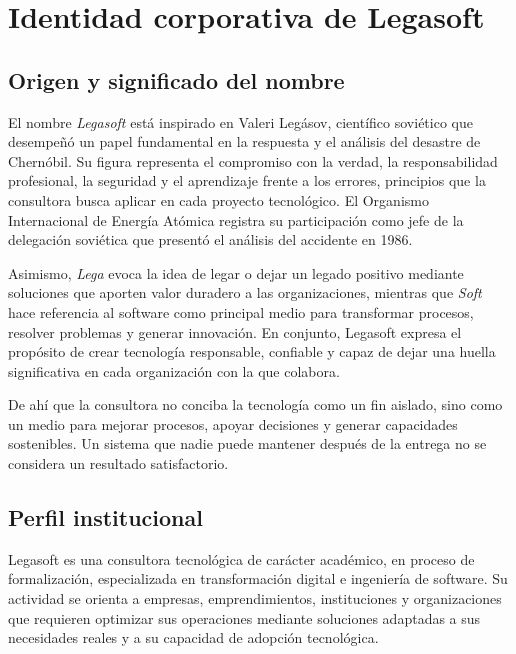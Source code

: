 \section{Identidad corporativa de Legasoft}

\subsection{Origen y significado del nombre}

El nombre \emph{Legasoft} está inspirado en Valeri Legásov, científico soviético
que desempeñó un papel fundamental en la respuesta y el análisis del desastre de
Chernóbil. Su figura representa el compromiso con la verdad, la responsabilidad
profesional, la seguridad y el aprendizaje frente a los errores, principios que
la consultora busca aplicar en cada proyecto tecnológico. El Organismo
Internacional de Energía Atómica registra su participación como jefe de la
delegación soviética que presentó el análisis del accidente en 1986.

Asimismo, \emph{Lega} evoca la idea de legar o dejar un legado positivo mediante
soluciones que aporten valor duradero a las organizaciones, mientras que
\emph{Soft} hace referencia al software como principal medio para transformar
procesos, resolver problemas y generar innovación. En conjunto, Legasoft expresa
el propósito de crear tecnología responsable, confiable y capaz de dejar una
huella significativa en cada organización con la que colabora.

De ahí que la consultora no conciba la tecnología como un fin aislado, sino como
un medio para mejorar procesos, apoyar decisiones y generar capacidades
sostenibles. Un sistema que nadie puede mantener después de la entrega no se
considera un resultado satisfactorio.

\subsection{Perfil institucional}

Legasoft es una consultora tecnológica de carácter académico, en proceso de
formalización, especializada en transformación digital e ingeniería de software.
Su actividad se orienta a empresas, emprendimientos, instituciones y
organizaciones que requieren optimizar sus operaciones mediante soluciones
adaptadas a sus necesidades reales y a su capacidad de adopción tecnológica.

